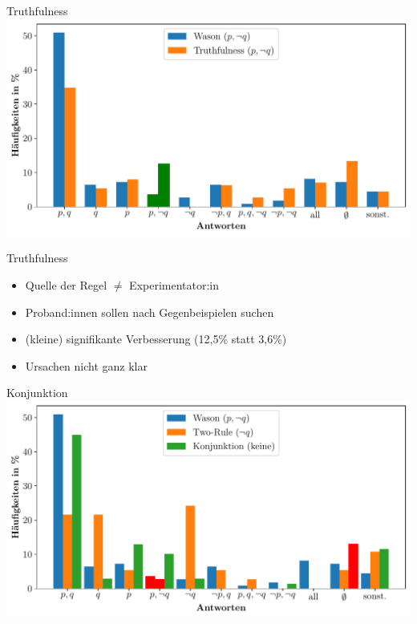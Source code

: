 \begin{frame}{Truthfulness {\scriptsize \cite[S.~109]{stenningHumanReasoningCognitive2008}}}
    \includegraphics[width=\textwidth]{../plot/results_truthfulness.pdf}
\end{frame}


\begin{frame}{Truthfulness {\scriptsize \cite[S.~107]{stenningHumanReasoningCognitive2008}}}
    \begin{itemize}
        \item Quelle der Regel $\ne$ Experimentator:in
        \item Proband:innen sollen nach Gegenbeispielen suchen
        \item (kleine) signifikante Verbesserung (12,5\% statt 3,6\%)
        \item Ursachen nicht ganz klar
    \end{itemize}
\end{frame}


\begin{frame}{Konjunktion {\scriptsize \cite[S.~109]{stenningHumanReasoningCognitive2008}}}
    \includegraphics[width=\textwidth]{../plot/results_conjunction.pdf}
\end{frame}


